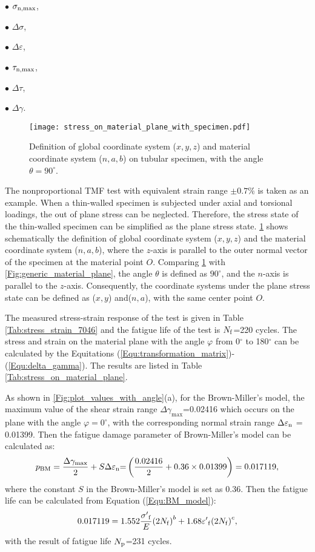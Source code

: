 $\bullet$ $\sigma_{\rm{n,max}}$,

$\bullet$ $\Delta \sigma$,

$\bullet$ $\Delta \varepsilon$,

$\bullet$ $\tau_{\rm{n,max}}$,

$\bullet$ $\Delta \tau$,

$\bullet$ $\Delta \gamma$.

\begin{figure}
\centering
\texttt{[image: stress\_on\_material\_plane\_with\_specimen.pdf]}
\caption{Definition of global coordinate system ($x,y,z$) and material coordinate system ($n,a,b$) on tubular specimen, with the angle $\theta=90^\circ$.}
\label{Fig:stress_on_material_plane_with_specimen}
\end{figure}

The nonproportional TMF test with equivalent strain range $\pm0.7\%$ is taken as an example.
When a thin-walled specimen is subjected under axial and torsional loadings, the out of plane stress can be neglected. Therefore, the stress state of the thin-walled specimen can be simplified as the plane stress state.
\ref {Fig:stress_on_material_plane_with_specimen} shows schematically the definition of global coordinate system ($x,y,z$) and the material coordinate system ($n,a,b$), where the $z$-axis is parallel to the outer normal vector of the specimen at the material point $O$.
Comparing \ref {Fig:stress_on_material_plane_with_specimen} with \ref{Fig:generic_material_plane}, the angle $\theta$ is defined as $90^\circ$, and the $n$-axis is parallel to the $z$-axis.
Consequently, the coordinate systems under the plane stress state can be defined as ($x,y$) and($n,a$), with the same center point $O$.

The measured stress-strain response of the test is given in Table \ref{Tab:stress_strain_7046} and the fatigue life of the test is $N_{\rm{f}}$=220 cycles. The stress and strain on the material plane with the angle $\varphi$ from 0$^\circ$ to 180$^\circ$ can be calculated by the Equitations (\ref{Equ:transformation_matrix})-(\ref{Equ:delta_gamma}).
The results are listed in Table \ref{Tab:stress_on_material_plane}.

As shown in \ref{Fig:plot_values_with_angle}(a), for the Brown-Miller's model, the maximum value of the shear strain range ${\Delta {\gamma _{\max }}}$=0.02416 which occurs on the plane with the angle $\varphi=0^\circ$, with the corresponding normal strain range $\Delta {\varepsilon _{\rm{n}}}$ = 0.01399. Then the fatigue damage parameter of Brown-Miller's model can be calculated as:
\[{p_{{\rm{BM}}}} = \frac{{\Delta {\gamma _{\max }}}}{2} + S\Delta {\varepsilon _{\rm{n}}}{\rm{ = }}\left( {\frac{{0.02416}}{2} + 0.36 \times 0.01399} \right) = 0.017119,\]
where the constant $S$ in the Brown-Miller's model is set as 0.36.
Then the fatigue life can be calculated from Equation (\ref{Equ:BM_model}):
\[0.017119 = 1.552\frac{{{{\sigma '}_{\rm{f}}}}}{E}{\left( {2{N_{\rm{f}}}} \right)^b} + 1.68{{\varepsilon '}_{\rm{f}}}{\left( {2{N_{\rm{f}}}} \right)^c},\]
with the result of fatigue life $N_{\rm{p}}$=231 cycles.

